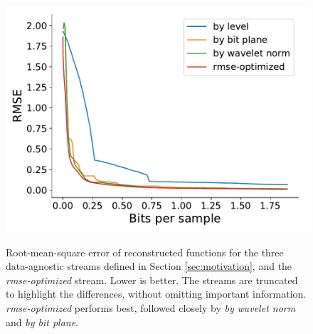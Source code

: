 \begin{figure}
 	{\includegraphics[width=0.48\linewidth]{img/rmse/rmse-optimized-velocityz.pdf}}
 	\caption{Root-mean-square error of reconstructed functions for the three data-agnostic streams
 	defined in Section \ref{sec:motivation}, and the \emph{rmse-optimized} stream. Lower is better.
 	The streams are truncated to highlight the differences, without omitting important information.
 	\emph{rmse-optimized} performs best, followed closely by \emph{by wavelet norm} and \emph{by bit
 	plane}.}
 	\label{fig:rmse-optimized}
\end{figure}

